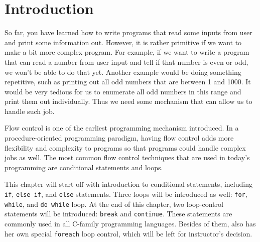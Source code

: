 \documentclass[../main.tex]{subfiles}
\begin{document}
\section{Introduction}
So far, you have learned how to write programs that read some inputs from user
and print some information out. However, it is rather primitive if we want to
make a bit more complex program. For example, if we want to write a program that
can read a number from user input and tell if that number is even or odd, we
won't be able to do that yet. Another example would be doing something repetitive,
such as printing out all odd numbers that are between 1 and 1000. It would be very
tedious for us to enumerate all odd numbers in this range and print them out 
individually. Thus we need some mechanism that can allow us to handle such job.

Flow control is one of the earliest programming mechanism introduced. In a
procedure-oriented programming paradigm, having flow control adds more flexibility
and complexity to programs so that programs could handle complex jobs as well. The
most common flow control techniques that are used in today's programming are
conditional statements and loops. 

This chapter will start off with introduction to conditional statements, including
\texttt{if}, \texttt{else if}, and \texttt{else} statements. Three loops will be 
introduced as well: \texttt{for}, \texttt{while}, and \texttt{do while} loop.
At the end of this chapter, two loop-control statements will be introduced:
\texttt{break} and \texttt{continue}. These statements are commonly used in all
C-family programming languages. Besides of them, \csharp also has her own special
\texttt{foreach} loop control, which will be left for instructor's decision.
\end{document}
